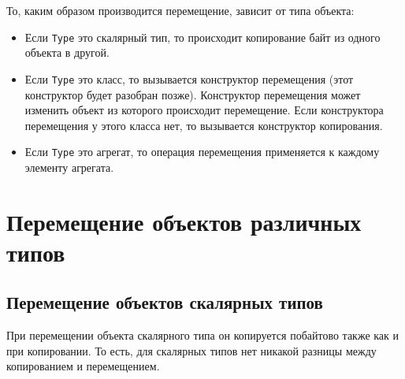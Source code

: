 \documentclass{article}
\begin{document}
То, каким образом производится перемещение, зависит от типа объекта:
\begin{itemize}
\item Если \texttt{Type} это скалярный тип, то происходит копирование байт из одного объекта в другой.
\item Если \texttt{Type} это класс, то вызывается конструктор перемещения (этот конструктор будет разобран позже). Конструктор перемещения может изменить объект из которого происходит перемещение. Если конструктора перемещения у этого класса нет, то вызывается конструктор копирования.
\item Если \texttt{Type} это агрегат, то операция перемещения применяется  к каждому элементу агрегата.
\end{itemize}





\newpage
\section*{Перемещение объектов различных типов}
\subsection*{Перемещение объектов скалярных типов}

При перемещении объекта скалярного типа он копируется побайтово также как и при копировании. То есть, для скалярных типов нет никакой разницы между копированием и перемещением.\\
\end{document}
